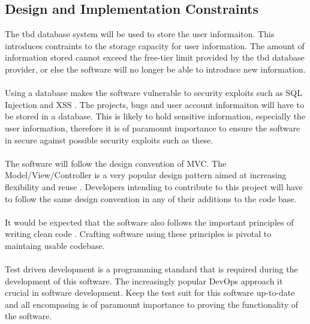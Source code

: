 \documentclass{article}
\newcommand{\comment}[1]{}
\begin{document}
\subsection{Design and Implementation Constraints} \label{designContraints}
\comment{
Descirbe any items or issues that will limit the options available to developers. These might include: corporate or regulatory policies; hardware limitations (timing requirements, memory requirements); interfaces to other applications; specific technologies, tools, and databases to be used, parallel operations; language requirements; communication protocols; security considerations; design conventions or programming standards (for example, if the customer's organization will be responsible for maintaining delivered software).
}
The \acrshort{tbd} database system will be used to store the user informaiton. This introduces contraints to the storage capacity for user information. The amount of information stored cannot exceed the free-tier limit provided by the \acrshort{tbd} database provider, or else the software will no longer be able to introduce new information.
\\ \\ 
Using a database makes the software vulnerable to security exploits such as SQL Injection \parencite{sqlInjection} and XSS \parencite{xss}. The projects, bugs and user account informaiton will have to be stored in a database. This is likely to hold sensitive information, especially the user information, therefore it is of paramount importance to ensure the software in secure against possible security exploits such as these.
\\ \\ 
The software will follow the design convention of MVC. The Model/View/Controller is a very popular design pattern aimed at increasing flexibility and reuse \cite{designpatterns97}. Developers intending to contribute to this project will have to follow the same design convention in any of their additions to the code base.
\\ \\ 
It would be expected that the software also follows the important principles of writing clean code \parencite{cleancode08}. Crafting software using these principles is pivotal to maintaing usable codebase. 
\\ \\ 
Test driven development is a programming standard that is required during the development of this software. The increasingly popular DevOps approach it crucial in software development. Keep the test suit for this software up-to-date and all encompasing is of paramount importance to proving the functionality of the software.
\end{document}
